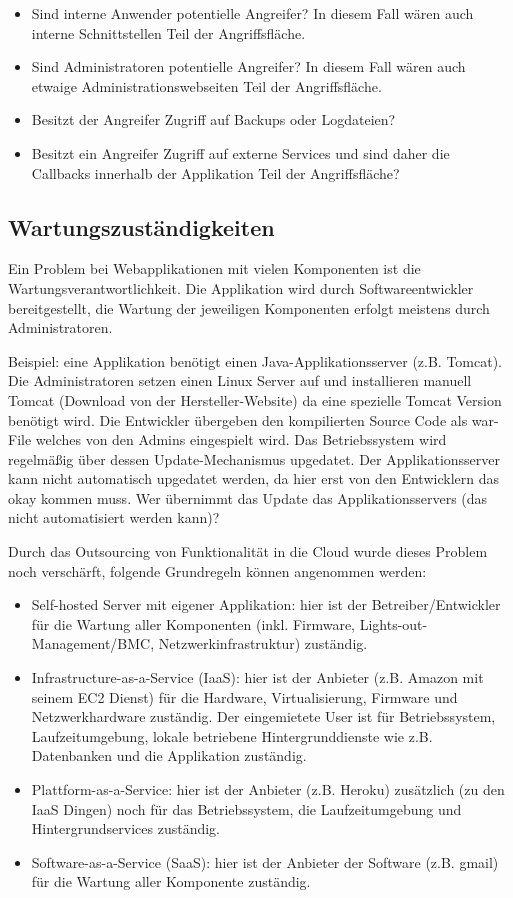 \begin{itemize}
	\item Sind interne Anwender potentielle Angreifer? In diesem Fall wären auch interne Schnittstellen Teil der Angriffsfläche.
	\item Sind Administratoren potentielle Angreifer? In diesem Fall wären auch etwaige Administrationswebseiten Teil der Angriffsfläche.
	\item Besitzt der Angreifer Zugriff auf Backups oder Logdateien?
	\item Besitzt ein Angreifer Zugriff auf externe Services und sind daher die Callbacks innerhalb der Applikation Teil der Angriffsfläche?
\end{itemize}

\subsection{Wartungszuständigkeiten}

Ein Problem bei Webapplikationen mit vielen Komponenten ist die Wartungsverantwortlichkeit. Die Applikation wird durch Softwareentwickler bereitgestellt, die Wartung der jeweiligen Komponenten erfolgt meistens durch Administratoren.

Beispiel: eine Applikation benötigt einen Java-Applikationsserver (z.B. Tomcat). Die Administratoren setzen einen Linux Server auf und installieren manuell Tomcat (Download von der Hersteller-Website) da eine spezielle Tomcat Version benötigt wird. Die Entwickler übergeben den kompilierten Source Code als war-File welches von den Admins eingespielt wird. Das Betriebssystem wird regelmäßig über dessen Update-Mechanismus upgedatet. Der Applikationsserver kann nicht automatisch upgedatet werden, da hier erst von den Entwicklern das okay kommen muss. Wer übernimmt das Update das Applikationsservers (das nicht automatisiert werden kann)?

Durch das Outsourcing von Funktionalität in die Cloud wurde dieses Problem noch verschärft, folgende Grundregeln können angenommen werden:

\begin{itemize}
	\item Self-hosted Server mit eigener Applikation: hier ist der Betreiber/Entwickler für die Wartung aller Komponenten (inkl. Firmware, Lights-out-Management/BMC, Netzwerkinfrastruktur) zuständig.
	\item Infrastructure-as-a-Service (IaaS): hier ist der Anbieter (z.B. Amazon mit seinem EC2 Dienst) für die Hardware, Virtualisierung, Firmware und Netzwerkhardware zuständig. Der eingemietete User ist für Betriebssystem, Laufzeitumgebung, lokale betriebene Hintergrunddienste wie z.B. Datenbanken und die Applikation zuständig.
	\item Plattform-as-a-Service: hier ist der Anbieter (z.B. Heroku) zusätzlich (zu den IaaS Dingen) noch für das Betriebssystem, die Laufzeitumgebung und Hintergrundservices zuständig.
	\item Software-as-a-Service (SaaS): hier ist der Anbieter der Software (z.B. gmail) für die Wartung aller Komponente zuständig.
\end{itemize}

